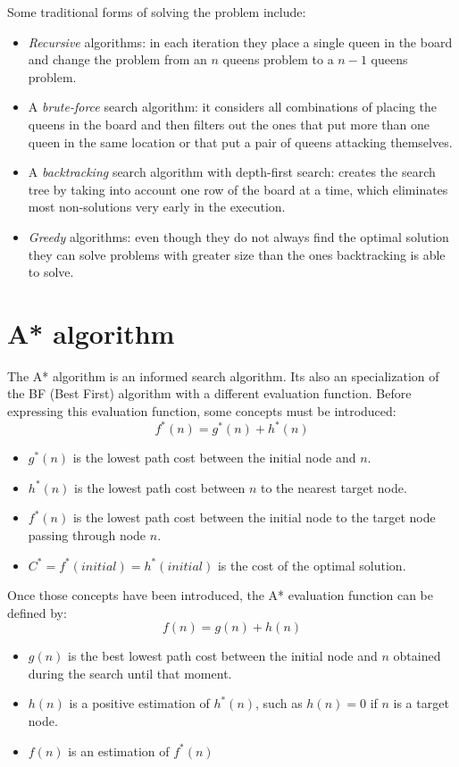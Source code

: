 \documentclass[]{llncs}
\begin{document}
Some traditional forms of solving the problem include:
\begin{itemize}
    \item \textit{Recursive} algorithms: in each iteration they place a single queen in the board and change the problem from an $n$ queens problem to a $n - 1$ queens problem.
    \item A \textit{brute-force} search algorithm: it considers all combinations of placing the queens in the board and then filters out the ones that put more than one queen in the same location or that put a pair of queens attacking themselves.
    \item A \textit{backtracking} search algorithm with depth-first search: creates the search tree by taking into account one row of the board at a time, which eliminates most non-solutions very early in the execution.
    \item \textit{Greedy} algorithms: even though they do not always find the optimal solution they can solve problems with greater size than the ones backtracking is able to solve.
\end{itemize}
\section{A* algorithm}\label{astar_alg}
The A* algorithm \cite{inteligencia_artificial,artificial_intelligence} is an informed search algorithm. Its also an specialization of the BF (Best First) algorithm with a different evaluation function. Before expressing this evaluation function, some concepts must be introduced:
\[f^{*}(n) = g^{*}(n) + h^{*}(n)\]
\begin{itemize}
    \item $g^{*}(n)$ is the lowest path cost between the initial node and $n$.
    \item $h^{*}(n)$ is the lowest path cost between $n$ to the nearest target node.
    \item $f^{*}(n)$ is the lowest path cost between the initial node to the target node passing through node $n$. 
    \item $C^{*} = f^{*}(initial) = h^{*}(initial)$ is the cost of the optimal solution. 
\end{itemize}

Once those concepts have been introduced, the A* evaluation function can be defined by:
\[f(n) = g(n) + h(n)\]
\begin{itemize}
    \item $g(n)$ is the best lowest path cost between the initial node and $n$ obtained during the search until that moment.
    \item $h(n)$ is a positive estimation of $h^{*}(n)$, such as $h(n) = 0$ if $n$ is a target node.
    \item $f(n)$ is an estimation of $f^{*}(n)$
\end{itemize}
\end{document}

